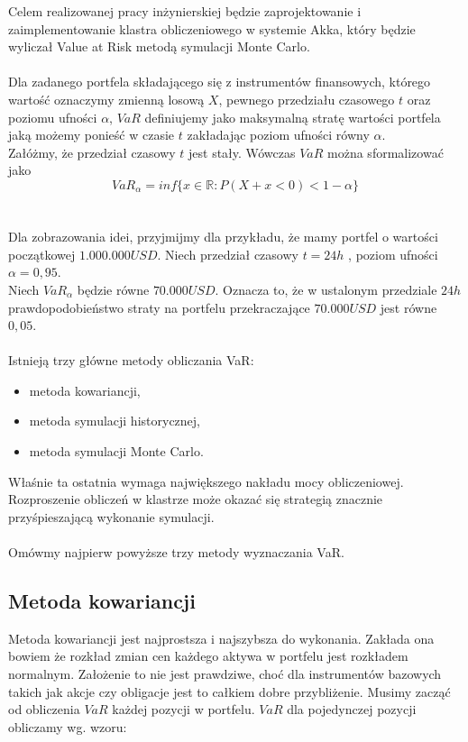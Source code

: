 \documentclass[11pt,titlepage]{article}
\numberwithin{equation}{section}
\begin{document}
Celem realizowanej pracy inżynierskiej będzie zaprojektowanie i zaimplementowanie klastra obliczeniowego w systemie Akka, który będzie wyliczał Value at Risk metodą symulacji Monte Carlo. 
\\
\\
Dla zadanego portfela składającego się z instrumentów finansowych, którego wartość oznaczymy zmienną losową $X$, pewnego przedziału czasowego $t$ oraz poziomu ufności $\alpha$, $VaR$ definiujemy jako maksymalną stratę wartości portfela jaką możemy ponieść w czasie $t$ zakładając poziom ufności równy $\alpha$.
\\
Załóżmy, że przedział czasowy $t$ jest stały. Wówczas $VaR$ można sformalizować jako
$$VaR_{\alpha}=inf\{ x\in \mathbb{R}:P(X+x<0) <  1-\alpha \}$$
\\
\\
Dla zobrazowania idei, przyjmijmy dla przykładu, że mamy portfel o wartości początkowej $1.000.000 USD$. Niech przedział czasowy $t=24h$ , poziom ufności $\alpha=0,95$. 
\\
Niech $VaR_{\alpha}$ będzie równe $70.000 USD$. Oznacza to, że w ustalonym przedziale $24h$ prawdopodobieństwo straty na portfelu przekraczające $70.000 USD$ jest równe $0,05$.  
\\
\\
\noindent Istnieją trzy główne metody obliczania VaR:

\begin{itemize}
  \item metoda kowariancji,
	\item metoda symulacji historycznej,
	\item metoda symulacji Monte Carlo.

\end{itemize}
Właśnie ta ostatnia wymaga największego nakładu mocy obliczeniowej. Rozproszenie obliczeń w klastrze może okazać się strategią znacznie przyśpieszającą wykonanie symulacji. 
\\
\\
Omówmy najpierw powyższe trzy metody wyznaczania VaR. 


\subsection{Metoda kowariancji}

Metoda kowariancji jest najprostsza i najszybsza do wykonania. Zakłada ona bowiem że rozkład zmian cen każdego aktywa w portfelu jest rozkładem normalnym. Założenie to nie jest prawdziwe, choć dla instrumentów bazowych takich jak akcje czy obligacje jest to całkiem dobre przybliżenie. Musimy zacząć od obliczenia $VaR$ każdej pozycji w portfelu. $VaR$ dla pojedynczej pozycji obliczamy wg. wzoru:
\end{document}
